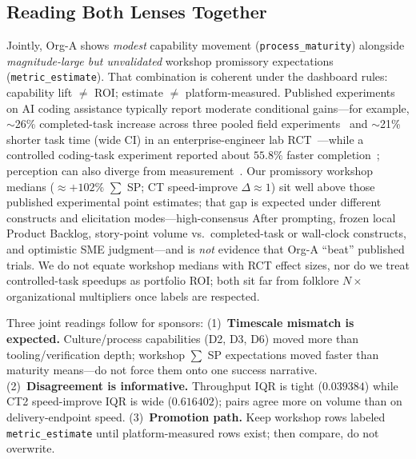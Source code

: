 \documentclass[10pt,conference]{IEEEtran}
\begin{document}
\subsection{Reading Both Lenses Together}
\label{sec:case-joint}

Jointly, Org-A shows \emph{modest} capability movement (\texttt{process\_maturity}) alongside \emph{magnitude-large but unvalidated} workshop promissory expectations (\texttt{metric\_estimate}).
That combination is coherent under the dashboard rules: capability lift $\neq$ ROI; estimate $\neq$ platform-measured.
Published experiments on AI coding assistance typically report moderate conditional gains---for example, $\sim$26\% completed-task increase across three pooled field experiments~\cite{Cui2026GenAIField} and $\sim$21\% shorter task time (wide CI) in an enterprise-engineer lab RCT~\cite{Paradis2024GoogleAISpeed}---while a controlled coding-task experiment reported about $55.8\%$ faster completion~\cite{Peng2023Copilot}; perception can also diverge from measurement~\cite{METR2025AIProductivity}.
Our promissory workshop medians ($\approx{+}102\%$ $\sum$ SP; CT speed-improve $\Delta\approx 1$) sit well above those published experimental point estimates; that gap is expected under different constructs and elicitation modes---high-consensus After prompting, frozen local Product Backlog, story-point volume vs.\ completed-task or wall-clock constructs, and optimistic SME judgment---and is \emph{not} evidence that Org-A ``beat'' published trials.
We do not equate workshop medians with RCT effect sizes, nor do we treat controlled-task speedups as portfolio ROI; both sit far from folklore $N\times$ organizational multipliers once labels are respected.

Three joint readings follow for sponsors:
(1)~\textbf{Timescale mismatch is expected.} Culture/process capabilities (D2, D3, D6) moved more than tooling/verification depth; workshop $\sum$ SP expectations moved faster than maturity means---do not force them onto one success narrative.
(2)~\textbf{Disagreement is informative.} Throughput IQR is tight ($0.039384$) while CT2 speed-improve IQR is wide ($0.616402$); pairs agree more on volume than on delivery-endpoint speed.
(3)~\textbf{Promotion path.} Keep workshop rows labeled \texttt{metric\_estimate} until platform-measured rows exist; then compare, do not overwrite.
\end{document}
